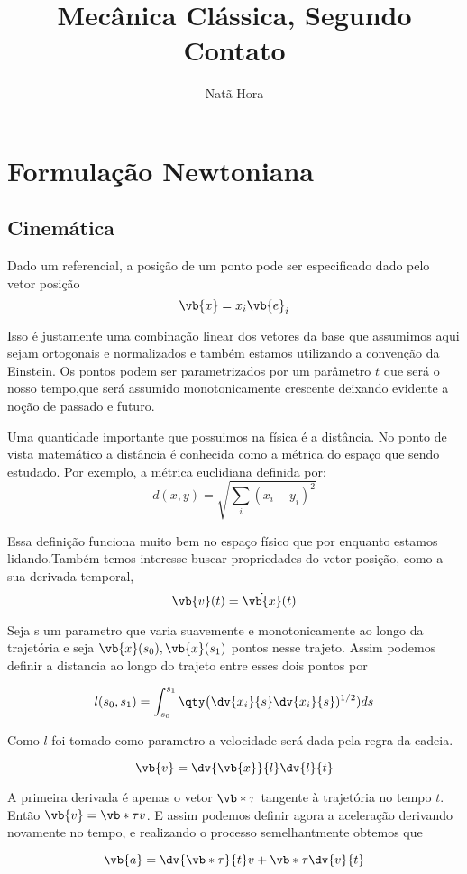 \documentclass{article}
\title{Mecânica Clássica, Segundo Contato}
\author{Natã Hora}
\begin{document}
 \maketitle
 \section{Formulação Newtoniana}
 \subsection{Cinemática}
 
 Dado um referencial, a posição de um ponto pode ser especificado dado pelo vetor posição 
 $$\vb{x}=x_i\vb{e}_i$$
 
 Isso é justamente uma combinação linear dos vetores da base que assumimos aqui sejam ortogonais e normalizados e também estamos utilizando a convenção da Einstein. Os pontos podem ser parametrizados por um parâmetro $t$ que será o nosso tempo,que será assumido monotonicamente crescente deixando evidente a noção de passado e futuro. 
 
 Uma quantidade importante que possuimos na física é a distância. No ponto de vista matemático a distância é conhecida como a métrica do espaço que sendo estudado. Por exemplo, a métrica euclidiana definida por:
 $$d(x,y)=\sqrt{\sum_{i}(x_i-y_i)^2}$$
 
 Essa definição funciona muito bem no espaço físico que por enquanto estamos lidando.Também temos interesse buscar propriedades do vetor posição, como a sua derivada temporal, 
 $$\vb{v}(t)=\dot{\vb{x}}(t)$$
 
 
 Seja s um parametro que varia suavemente e monotonicamente ao longo da trajetória  e seja $\vb{x}(s_0),\vb{x}(s_1)$ pontos nesse trajeto. Assim podemos definir a distancia ao longo do trajeto entre esses dois pontos por
 

$$l(s_0,s_1)= \int_{s_0}^{s_1} \qty\big(\dv{x_i}{s}\dv{x_i}{s})^{1/2}) ds$$
 
 
 Como $l$ foi tomado como parametro a velocidade será dada pela regra da cadeia.
 
 $$\vb{v}=\dv{\vb{x}}{l}\dv{l}{t}$$
 
 A primeira derivada é apenas o vetor $\vb*{\tau}$ tangente à trajetória no tempo $t$. Então $\vb{v}=\vb*{\tau}v$. E assim podemos definir agora a aceleração derivando novamente no tempo, e realizando o processo semelhantmente obtemos que
 
 $$\vb{a}=\dv{\vb*{\tau}}{t}v+\vb*{\tau} \dv{v}{t}$$
 
\end{document}
